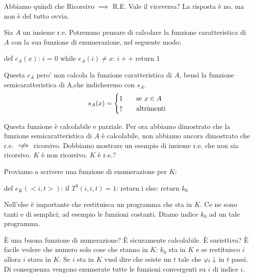 
Abbiamo quindi che Ricorsivo $\implies$ R.E. Vale il viceversa? La risposta è no, ma non è del tutto
ovvia.

Sia $A$ un insieme r.e. Potremmo pensare di calcolare la funzione caratteristica di $A$ con la sua
funzione di enumerazione, nel seguente modo:
\begin{python}
    def $c_{A}(x)$:
        $i$ = 0
        while $e_{A}(i) \not= x$:
            $i++$ 
        return 1
\end{python}

Questa $c_{A}$ pero' non calcola la funzione caratteristica di $A$, bensì la funzione
semicaratteristica di A,che indicheremo con $s_{A}$.
\begin{equation*}
    s_{A}(x) =
    \begin{cases}
        1 \quad &\text{se $x \in A$} \\
        \uparrow \quad &\text{altrimenti}
    \end{cases}
\end{equation*}

Questa funzione è calcolabile e parziale. Per ora abbiamo dimostrato che la funzione
semicaratteristica di $A$ è calcolabile, non abbiamo ancora dimostrato che r.e. $\centernot\implies$
ricorsivo. Dobbiamo mostrare un esempio di insieme r.e. che non sia ricorsivo. $K$ è non
ricorsivo. $K$ è r.e.?

Proviamo a scrivere una funzione di enumerazione per $K$:
\begin{python}
    def $e_{K}(<i,t>)$:
        if $T^{3}(i,i,t) = 1$:
            return i
        else:
            return $k_{0}$
\end{python}
        
Nell'else è importante che restituisca un programma che sta in $K$. Ce ne sono tanti e di semplici;
ad esempio le funzioni costanti. Diamo indice $k_{0}$ ad un tale programma.

È una buona funzione di numerazione? È sicuramente calcolabile. È suriettiva? È facile vedere che
numero solo cose che stanno in $K$: $k_{0}$ sta in $K$ e se restituisco $i$ allora $i$ stava in $K$.
Se $i$ sta in $K$ vuol dire che esiste un $t$ tale che $\varphi_{i} \downarrow$ in $t$ passi. Di conseguenza
vengono enumerate tutte le funzioni convergenti su $i$ di indice $i$. 

